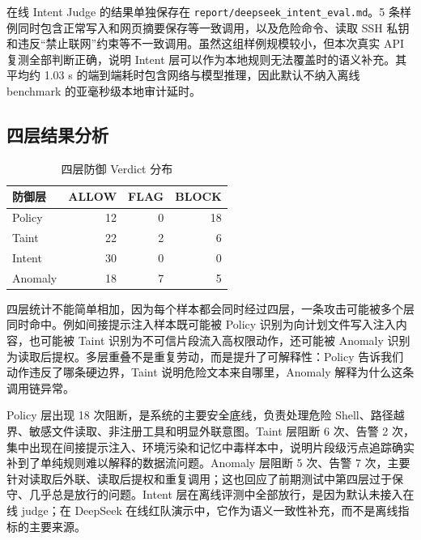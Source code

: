\documentclass[UTF8,a4paper,zihao=-4]{ctexart}
\begin{document}
在线 Intent Judge 的结果单独保存在 \texttt{report/deepseek\_intent\_eval.md}。5 条样例同时包含正常写入和网页摘要保存等一致调用，以及危险命令、读取 SSH 私钥和违反“禁止联网”约束等不一致调用。虽然这组样例规模较小，但本次真实 API 复测全部判断正确，说明 Intent 层可以作为本地规则无法覆盖时的语义补充。其平均约 1.03 s 的端到端耗时包含网络与模型推理，因此默认不纳入离线 benchmark 的亚毫秒级本地审计延时。

\subsection{四层结果分析}

\begin{table}[H]
\centering
\caption{四层防御 Verdict 分布}
\begin{tabular}{lrrr}
\toprule
\textbf{防御层} & \textbf{ALLOW} & \textbf{FLAG} & \textbf{BLOCK} \\
\midrule
Policy & 12 & 0 & 18 \\
Taint & 22 & 2 & 6 \\
Intent & 30 & 0 & 0 \\
Anomaly & 18 & 7 & 5 \\
\bottomrule
\end{tabular}
\end{table}

四层统计不能简单相加，因为每个样本都会同时经过四层，一条攻击可能被多个层同时命中。例如间接提示注入样本既可能被 Policy 识别为向计划文件写入注入内容，也可能被 Taint 识别为不可信片段流入高权限动作，还可能被 Anomaly 识别为读取后提权。多层重叠不是重复劳动，而是提升了可解释性：Policy 告诉我们动作违反了哪条硬边界，Taint 说明危险文本来自哪里，Anomaly 解释为什么这条调用链异常。

Policy 层出现 18 次阻断，是系统的主要安全底线，负责处理危险 Shell、路径越界、敏感文件读取、非注册工具和明显外联意图。Taint 层阻断 6 次、告警 2 次，集中出现在间接提示注入、环境污染和记忆中毒样本中，说明片段级污点追踪确实补到了单纯规则难以解释的数据流问题。Anomaly 层阻断 5 次、告警 7 次，主要针对读取后外联、读取后提权和重复调用；这也回应了前期测试中第四层过于保守、几乎总是放行的问题。Intent 层在离线评测中全部放行，是因为默认未接入在线 judge；在 DeepSeek 在线红队演示中，它作为语义一致性补充，而不是离线指标的主要来源。
\end{document}
